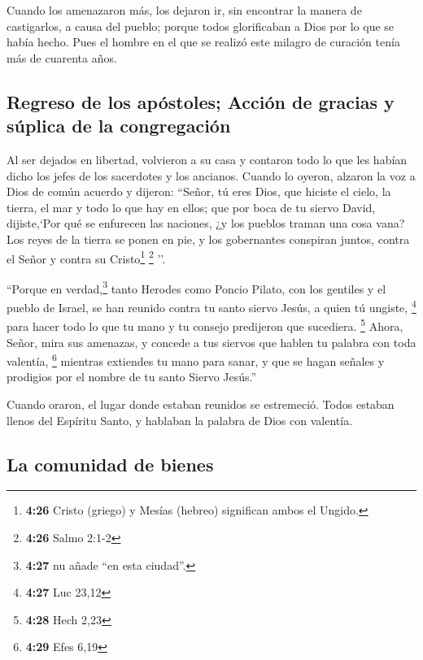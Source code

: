 \begin{paracol}{2}
 Cuando los amenazaron más, los dejaron ir, sin encontrar
la manera de castigarlos, a causa del pueblo; porque todos glorificaban
a Dios por lo que se había hecho.  Pues el hombre en el
que se realizó este milagro de curación tenía más de cuarenta años.

\hypertarget{regreso-de-los-apuxf3stoles-acciuxf3n-de-gracias-y-suxfaplica-de-la-congregaciuxf3n}{%
\subsection{Regreso de los apóstoles; Acción de gracias y súplica de la
congregación}\label{regreso-de-los-apuxf3stoles-acciuxf3n-de-gracias-y-suxfaplica-de-la-congregaciuxf3n}}

 Al ser dejados en libertad, volvieron a su casa y
contaron todo lo que les habían dicho los jefes de los sacerdotes y los
ancianos.  Cuando lo oyeron, alzaron la voz a Dios de
común acuerdo y dijeron: ``Señor, tú eres Dios, que hiciste el cielo, la
tierra, el mar y todo lo que hay en ellos;  que por boca
de tu siervo David, dijiste,`Por qué se enfurecen las naciones, ¿y los
pueblos traman una cosa vana?  Los reyes de la tierra se
ponen en pie, y los gobernantes conspiran juntos, contra el Señor y
contra su Cristo\footnote{\textbf{4:26} Cristo (griego) y Mesías
  (hebreo) significan ambos el Ungido.} \footnote{\textbf{4:26} Salmo
  2:1-2} ''.

 ``Porque en verdad,\footnote{\textbf{4:27} nu añade ``en
  esta ciudad''.} tanto Herodes como Poncio Pilato, con los gentiles y
el pueblo de Israel, se han reunido contra tu santo siervo Jesús, a
quien tú ungiste, \footnote{\textbf{4:27} Luc 23,12} 
para hacer todo lo que tu mano y tu consejo predijeron que sucediera.
\footnote{\textbf{4:28} Hech 2,23}  Ahora, Señor, mira
sus amenazas, y concede a tus siervos que hablen tu palabra con toda
valentía, \footnote{\textbf{4:29} Efes 6,19}  mientras
extiendes tu mano para sanar, y que se hagan señales y prodigios por el
nombre de tu santo Siervo Jesús.''

 Cuando oraron, el lugar donde estaban reunidos se
estremeció. Todos estaban llenos del Espíritu Santo, y hablaban la
palabra de Dios con valentía.

\hypertarget{la-comunidad-de-bienes}{%
\subsection{La comunidad de bienes}\label{la-comunidad-de-bienes}}


\end{paracol}
